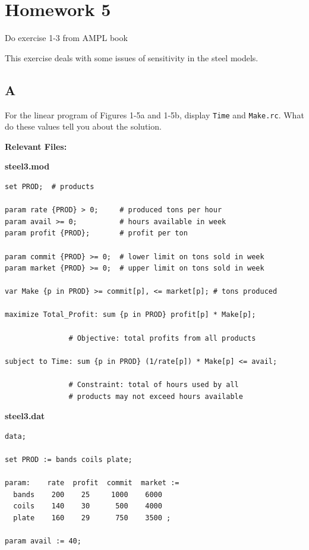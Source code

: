 \section*{Homework 5}

Do exercise 1-3 from AMPL book

This exercise deals with some issues of sensitivity in the steel models.

\subsection*{A}

\prob

For the linear program of Figures 1-5a and 1-5b, display \texttt{Time} and \texttt{Make.rc}. What do these values tell you about the solution.

\noindent\textbf{Relevant Files:}

\noindent\textbf{steel3.mod}

\begin{lstlisting}
set PROD;  # products

param rate {PROD} > 0;     # produced tons per hour
param avail >= 0;          # hours available in week
param profit {PROD};       # profit per ton

param commit {PROD} >= 0;  # lower limit on tons sold in week
param market {PROD} >= 0;  # upper limit on tons sold in week

var Make {p in PROD} >= commit[p], <= market[p]; # tons produced

maximize Total_Profit: sum {p in PROD} profit[p] * Make[p];

               # Objective: total profits from all products

subject to Time: sum {p in PROD} (1/rate[p]) * Make[p] <= avail;

               # Constraint: total of hours used by all
               # products may not exceed hours available

\end{lstlisting}

\noindent\textbf{steel3.dat}

\begin{lstlisting}
data;

set PROD := bands coils plate;

param:    rate  profit  commit  market :=
  bands    200    25     1000    6000
  coils    140    30      500    4000
  plate    160    29      750    3500 ;

param avail := 40;
\end{lstlisting}

